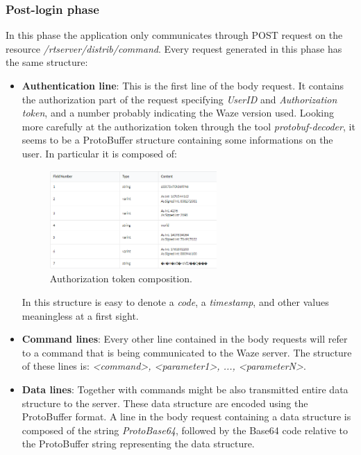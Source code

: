 		\subsubsection{Post-login phase}
			\par In this phase the application only communicates through POST request on the resource \textit{/rtserver/distrib/command}. Every request generated in this phase has the same structure:			
			\begin{itemize}
				\item \textbf{Authentication line}: This is the first line of the body request. It contains the authorization part of the request specifying \textit{UserID} and \textit{Authorization token}, and a number probably indicating the Waze version used. \newline
				Looking more carefully at the authorization token through the tool \textit{protobuf-decoder}, it seems to be a ProtoBuffer structure containing some informations on the user. In particular it is composed of:
				\begin{figure}[H]
					\centering
					\includegraphics[width=0.6\textwidth]{images/waze_logintoken.png}
					\caption{Authorization token composition.}
				\end{figure}
				In this structure is easy to denote a \textit{code}, a \textit{timestamp}, and other values meaningless at a first sight.
				\item \textbf{Command lines}: Every other line contained in the body requests will refer to a command that is being communicated to the Waze server. The structure of these lines is: \textit{<command>, <parameter1>, ..., <parameterN>}. 
				\item \textbf{Data lines}: Together with commands might be also transmitted entire data structure to the server. These data structure are encoded using the ProtoBuffer format. A line in the body request containing a data structure is composed of the string \textit{ProtoBase64}, followed by the Base64 code relative to the ProtoBuffer string representing the data structure. 
			\end{itemize}

